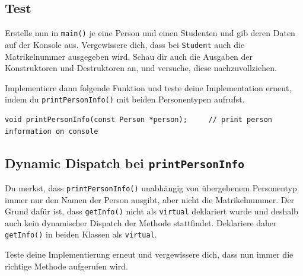 
\subsection{Test}
Erstelle nun in \texttt{main()} je eine Person und einen Studenten und gib deren Daten auf der Konsole aus.
Vergewissere dich, dass bei \texttt{Student} auch die Matrikelnummer ausgegeben wird.
Schau dir auch die Ausgaben der Konstruktoren und Destruktoren an, und versuche, diese nachzuvollziehen.

Implementiere dann folgende Funktion und teste deine Implementation erneut, indem du \texttt{printPersonInfo()} mit beiden Personentypen aufrufst.

\begin{lstlisting}
void printPersonInfo(const Person *person);		// print person information on console
\end{lstlisting}



\subsection{Dynamic Dispatch bei \texttt{printPersonInfo}}
Du merkst, dass \texttt{printPersonInfo()} unabhängig von übergebenem Personentyp immer nur den Namen der Person ausgibt, aber nicht die Matrikelnummer.
Der Grund dafür ist, dass \texttt{getInfo()} nicht als \texttt{virtual} deklariert wurde und deshalb auch kein dynamischer Dispatch der Methode stattfindet.
Deklariere daher \texttt{getInfo()} in beiden Klassen als \texttt{virtual}.

Teste deine Implementierung erneut und vergewissere dich, dass nun immer die richtige Methode aufgerufen wird.

